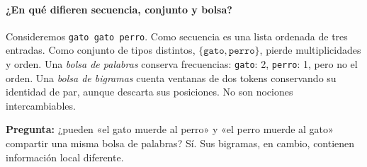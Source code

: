 \paragraph{¿En qué difieren secuencia, conjunto y bolsa?}
Consideremos \texttt{gato gato perro}. Como secuencia es una lista ordenada de tres entradas. Como conjunto de tipos distintos, $\{\texttt{gato},\texttt{perro}\}$, pierde multiplicidades y orden. Una \emph{bolsa de palabras} conserva frecuencias: \texttt{gato}: 2, \texttt{perro}: 1, pero no el orden. Una \emph{bolsa de bigramas} cuenta ventanas de dos tokens conservando su identidad de par, aunque descarta sus posiciones. No son nociones intercambiables.
\begin{center}
\end{center}
\noindent\textbf{Pregunta:} ¿pueden «el gato muerde al perro» y «el perro muerde al gato» compartir una misma bolsa de palabras? Sí. Sus bigramas, en cambio, contienen información local diferente.

